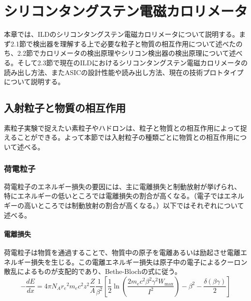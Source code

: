 
\chapter{シリコンタングステン電磁カロリメータ} \label{sec:1.Siwecal}
本章では、ILDのシリコンタングステン電磁カロリメータについて説明する。まず2.1節で検出器を理解する上で必要な粒子と物質の相互作用について述べたのち、2.2節でカロリメータの検出原理やシリコン検出器の検出原理について述べる。そして2.3節で現在のILDにおけるシリコンタングステン電磁カロリメータの読み出し方法、またASICの設計性能や読み出し方法、現在の技術プロトタイプについて説明する。
\section{入射粒子と物質の相互作用}
素粒子実験で捉えたい素粒子やハドロンは、粒子と物質との相互作用によって捉えることができる。よって本節では入射粒子の種類ごとに物質との相互作用について述べる。
\subsection{荷電粒子}
荷電粒子のエネルギー損失の要因には、主に電離損失と制動放射が挙げられ\cite{blue}、特にエネルギーの低いところでは電離損失の割合が高くなる。（電子ではエネルギーの高いところでは制動放射の割合が高くなる。）以下ではそれぞれについて述べる。
\subsubsection{電離損失}
荷電粒子は物質を通過することで、物質中の原子を電離あるいは励起させ電離エネルギー損失を生じる。この電離エネルギー損失は原子中の電子によるクーロン散乱によるものが支配的であり、Bethe-Blochの式に従う。
\begin{equation}
-\frac{dE}{dx} = 4\pi N_A {r_e}^2 m_e c^2 z^2 \frac{Z}{A} \frac{1}{{\beta}^2} \left[ \frac{1}{2} \ln(\frac{2m_e c^2{\beta}^2{\gamma}^2W_{\mathrm{max}}}{I^2}) -{\beta}^2 - \frac{\delta(\beta \gamma)}{2} \right]
\end{equation}

